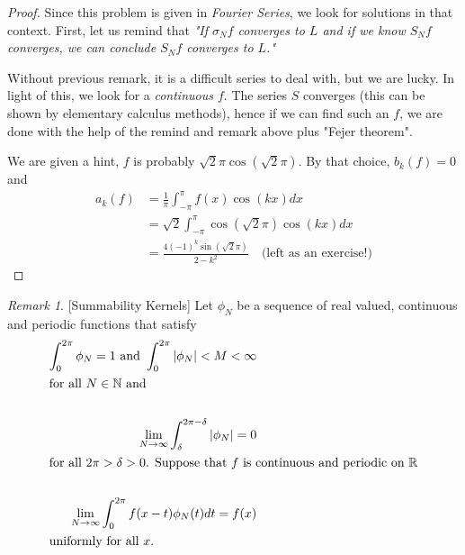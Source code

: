 \documentclass{article}
\theoremstyle{remark}
\newtheorem*{remark}{Remark}
\theoremstyle{lemma}
\theoremstyle{example}
\theoremstyle{proofTrial}
\theoremstyle{definition}
\begin{document}
\begin{proof}
    Since this problem is given in \textit{Fourier Series}, we look for solutions in that context. First, let us remind that \textit{"If $\sigma_Nf$ converges to $L$ and if we know $S_Nf$ converges, we can conclude $S_Nf$ converges to $L$."}

    \par Without previous remark, it is a difficult series to deal with, but we are lucky. In light of this, we look for a \textit{continuous $f$}. The series $S$ converges (this can be shown by elementary calculus methods), hence if we can find such an \(f\), we are done with the help of the remind and remark above plus "Fejer theorem". \par

    We are given a hint, \(f\) is probably $\sqrt{2}\pi\cos(\sqrt{2}\pi)$. By that choice, $b_k(f) = 0$ and
    \begin{align*}
        a_k(f) &= \frac{1}{\pi} \int_{-\pi}^{\pi} f(x) \cos(kx) dx \\
               &= \sqrt{2} \int_{-\pi}^{\pi}  \cos(\sqrt{2}\pi) \cos(kx) dx \\
               &= \frac{4(-1)^k\sin(\sqrt{2}\pi)}{2-k^2} \quad \text{(left as an exercise!)}
    \end{align*}
\end{proof}

\begin{remark}{[Summability Kernels]} Let $\phi_N$ be a sequence of real valued, continuous and periodic functions that satisfy
\begin{align*}
    \int_{0}^{2\pi} \phi_N = 1 \text{ and } \int_{0}^{2\pi} |\phi_N| < M < \infty \\
    \intertext{for all $N \in \mathbb{N}$ and }\\
    \lim_{N \to \infty} \int_{\delta}^{2\pi - \delta} |\phi_N| = 0\\
    \intertext{for all $2\pi > \delta > 0$. Suppose that $f$ is continuous and periodic on $\mathbb{R}$}\\
    \lim_{N \to \infty} \int_{0}^{2\pi} f(x - t)\phi_N(t)dt = f(x)\\
    \intertext{uniformly for all $x$.}
\end{align*}
\end{remark}
\end{document}
